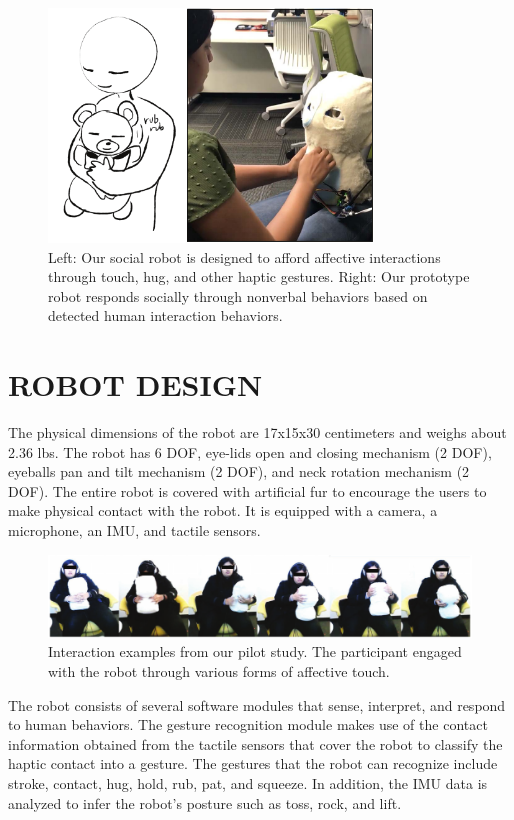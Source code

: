 \documentclass[letterpaper, 10 pt, conference]{ieeeconf}  %
\begin{document}
\begin{figure}[t!]
\centering
\includegraphics[width=3.4in]{teaser.pdf}
\vskip -10pt
\caption{Left: Our social robot is designed to afford affective interactions through touch, hug, and other haptic gestures. Right: Our prototype robot responds socially through nonverbal behaviors based on detected human interaction behaviors.}
\label{fig:teaser}
\end{figure}

\section{ROBOT DESIGN}
The physical dimensions of the robot are 17x15x30 centimeters and weighs about 2.36 lbs. The robot has 6 DOF, eye-lids open and closing mechanism (2 DOF), eyeballs pan and tilt mechanism (2 DOF), and neck rotation mechanism (2 DOF). The entire robot is covered with artificial fur to encourage the users to make physical contact with the robot. It is equipped with a camera, a microphone, an IMU, and tactile sensors.  

\begin{figure}[t!]
\centering
\includegraphics[width=\textwidth]{pilot-data.pdf}
\vskip -10pt
\caption{Interaction examples from our pilot study. The participant engaged with the robot through various forms of affective touch.}
\label{fig:pilot-study}
\end{figure}

The robot consists of several software modules that sense, interpret, and respond to human behaviors. The gesture recognition module makes use of the contact information obtained from the tactile sensors that cover the robot to classify the haptic contact into a gesture. The gestures that the robot can recognize include stroke, contact, hug, hold, rub, pat, and squeeze. In addition, the IMU data is analyzed to infer the robot's posture such as toss, rock, and lift.  
\end{document}
